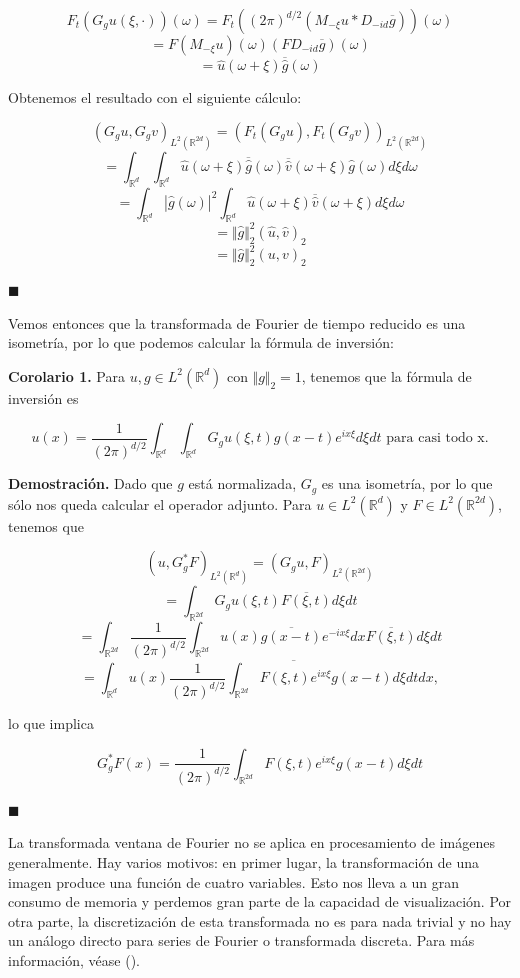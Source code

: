 \begin{itemize}
$$F_t(G_g u(\xi,·))(\omega) = F_t((2\pi)^{d/2}(M_{-\xi}u*D_{-id}\overline{g}))(\omega)$$
$$= F(M_{-\xi}u)(\omega)(F D_{-id}\overline{g})(\omega)$$
$$= \hat{u}(\omega+\xi)\overline{\hat{g}}(\omega)$$

Obtenemos el resultado con el siguiente cálculo:

$$(G_g u,G_g v)_{L^2(\mathbb{R}^{2d})} = (F_t(G_g u), F_t(G_g v))_{L^2(\mathbb{R}^{2d})}$$
$$ = \int_{\mathbb{R}^d} \int_{\mathbb{R}^d} \hat{u}(\omega + \xi) \overline{\hat{g}}(\omega) \overline{\hat{v}}(\omega+\xi)\hat{g}(\omega) d\xi d\omega$$
$$= \int_{\mathbb{R}^d} |\hat{g}(\omega)|^2 \int_{\mathbb{R}^d} \hat{u}(\omega+\xi) \overline{\hat{v}}(\omega+\xi) d\xi d\omega$$
$$=\Vert \hat{g} \Vert_2^2(\hat{u},\hat{v})_2$$
$$=\Vert \hat{g} \Vert_2^2(u,v)_2$$

\hfill$\blacksquare$


Vemos entonces que la transformada de Fourier de tiempo reducido es una isometría, por lo que podemos calcular la fórmula de inversión:

\textbf{Corolario 1.} Para $u,g \in L^2(\mathbb{R}^d)$ con $\Vert g \Vert_2 = 1$, tenemos que la fórmula de inversión es

$$u(x) = \frac{1}{(2\pi)^{d/2}} \int_{\mathbb{R}^d} \int_{\mathbb{R}^d} G_g u(\xi,t) g(x-t) e^{ix\xi} d\xi dt \text{    para casi todo x.}$$


\textbf{Demostración.} Dado que $g$ está normalizada, $G_g$ es una isometría, por lo que sólo nos queda calcular el operador adjunto. Para $u \in L^2(\mathbb{R}^d)$ y $F \in L^2(\mathbb{R}^{2d})$, tenemos que

$$ (u, G_g^*F)_{L^2(\mathbb{R}^d)} = (G_g u,F)_{L^2(\mathbb{R}^{2d})}$$
$$ = \int_{\mathbb{R}^{2d}} G_g u(\xi,t) \overline{F(\xi,t)} d\xi dt$$
$$ = \int_{\mathbb{R}^{2d}} \frac{1}{(2\pi)^{d/2}} \int_{\mathbb{R}^{2d}} u(x) \overline{g(x-t)} e^{-ix \xi}dx \overline{F(\xi,t)} d\xi dt$$
$$ = \int_{\mathbb{R}^d} u(x) \overline{\frac{1}{(2\pi)^{d/2}} \int_{\mathbb{R}^{2d}} F(\xi,t) e^{ix\xi}g(x-t)d\xi dt} dx,$$

lo que implica

$$G_g^*F(x) = \frac{1}{(2\pi)^{d/2}} \int_{\mathbb{R}^{2d}} F(\xi,t) e^{ix\xi}g(x-t)d\xi dt$$

\hfill$\blacksquare$

La transformada ventana de Fourier no se aplica en procesamiento de imágenes generalmente. Hay varios motivos: en primer lugar, la transformación de una imagen produce una función de cuatro variables. Esto nos lleva a un gran consumo de memoria y perdemos gran parte de la capacidad de visualización. Por otra parte, la discretización de esta transformada no es para nada trivial y no hay un análogo directo para series de Fourier o transformada discreta. Para más información, véase (\cite{ftta}).


\end{itemize}
